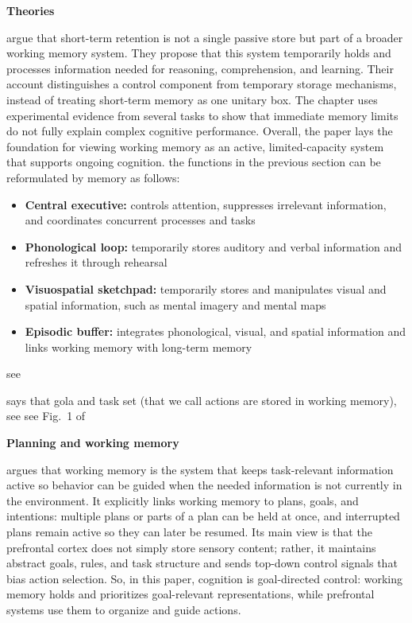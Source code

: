 \documentclass{book}
\providecommand{\ProjectDeepHeading}[2]{%
    \par\medskip\noindent\textbf{#2}\par\smallskip
}
\begin{document}
    
    \ProjectDeepHeading{7}{Theories}
        \cite{baddeley-1974-working-memory} argue that short-term retention is not a single passive store but part of a broader working memory system. They propose that this system temporarily holds and processes information needed for reasoning, comprehension, and learning. Their account distinguishes a control component from temporary storage mechanisms, instead of treating short-term memory as one unitary box. The chapter uses experimental evidence from several tasks to show that immediate memory limits do not fully explain complex cognitive performance. Overall, the paper lays the foundation for viewing working memory as an active, limited-capacity system that supports ongoing cognition.
        the functions in the previous section can be reformulated by \cite{baddeley-1974-working-memory} memory as follows:
        \begin{itemize}
            \item \textbf{Central executive:} controls attention, suppresses irrelevant information, and coordinates concurrent processes and tasks
            \item \textbf{Phonological loop:} temporarily stores auditory and verbal information and refreshes it through rehearsal
            \item \textbf{Visuospatial sketchpad:} temporarily stores and manipulates visual and spatial information, such as mental imagery and mental maps
            \item \textbf{Episodic buffer:} integrates phonological, visual, and spatial information and links working memory with long-term memory
        \end{itemize}
        
        
        see \cite{cowan-2017-the-many-faces-of-working-memory}
        
        \cite{eriksson-2015-neurocognitive-architecture-of-working-memory} says that gola and task set (that we call actions are stored in working memory), see see Fig.~1 of \cite{eriksson-2015-neurocognitive-architecture-of-working-memory}
    
    
    \ProjectDeepHeading{7}{Planning and working memory}
        
        \cite{desposito-2015-the-cognitive-neuroscience-of-working-memory} argues that working memory is the system that keeps task-relevant information active so behavior can be guided when the needed information is not currently in the environment. It explicitly links working memory to plans, goals, and intentions: multiple plans or parts of a plan can be held at once, and interrupted plans remain active so they can later be resumed. Its main view is that the prefrontal cortex does not simply store sensory content; rather, it maintains abstract goals, rules, and task structure and sends top-down control signals that bias action selection. So, in this paper, cognition is goal-directed control: working memory holds and prioritizes goal-relevant representations, while prefrontal systems use them to organize and guide actions.
        
\end{document}
